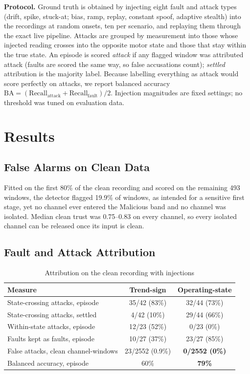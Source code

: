 \documentclass[conference]{IEEEtran}
\begin{document}
\textbf{Protocol.} Ground truth is obtained by injecting eight fault and attack types (drift, spike, stuck-at; bias, ramp, replay, constant spoof, adaptive stealth) into the recordings at random onsets, ten per scenario, and replaying them through the exact live pipeline. Attacks are grouped by measurement into those whose injected reading crosses into the opposite motor state and those that stay within the true state. An episode is scored \emph{attack} if any flagged window was attributed attack (faults are scored the same way, so false accusations count); \emph{settled} attribution is the majority label. Because labelling everything as attack would score perfectly on attacks, we report balanced accuracy $\mathrm{BA} = (\mathrm{Recall}_{\mathrm{attack}} + \mathrm{Recall}_{\mathrm{fault}})/2$. Injection magnitudes are fixed settings; no threshold was tuned on evaluation data.

\section{Results}

\subsection{False Alarms on Clean Data}

Fitted on the first 80\% of the clean recording and scored on the remaining 493 windows, the detector flagged 19.9\% of windows, as intended for a sensitive first stage, yet no channel ever entered the Malicious band and no channel was isolated. Median clean trust was 0.75--0.83 on every channel, so every isolated channel can be released once its input is clean.

\subsection{Fault and Attack Attribution}

\begin{table}[t]
\centering
\caption{Attribution on the clean recording with injections}
\label{tab:attr}
\footnotesize
\setlength{\tabcolsep}{4pt}
\begin{tabular}{@{}lcc@{}}
\toprule
Measure & Trend-sign & Operating-state \\
\midrule
State-crossing attacks, episode & 35/42 (83\%) & 32/44 (73\%) \\
State-crossing attacks, settled & 4/42 (10\%) & 29/44 (66\%) \\
Within-state attacks, episode & 12/23 (52\%) & 0/23 (0\%) \\
Faults kept as faults, episode & 10/27 (37\%) & 23/27 (85\%) \\
False attacks, clean channel-windows & 23/2552 (0.9\%) & \textbf{0/2552 (0\%)} \\
Balanced accuracy, episode & 60\% & \textbf{79\%} \\
\bottomrule
\end{tabular}
\end{table}
\end{document}
